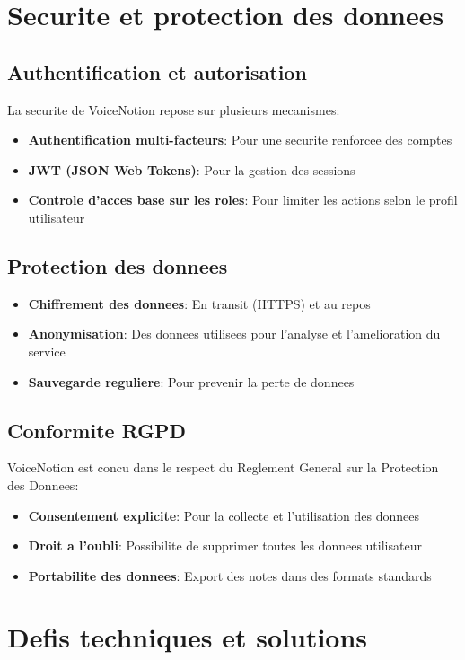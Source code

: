 \section{Securite et protection des donnees}
\subsection{Authentification et autorisation}
La securite de VoiceNotion repose sur plusieurs mecanismes:
\begin{itemize}
    \item \textbf{Authentification multi-facteurs}: Pour une securite renforcee des comptes
    \item \textbf{JWT (JSON Web Tokens)}: Pour la gestion des sessions
    \item \textbf{Controle d'acces base sur les roles}: Pour limiter les actions selon le profil utilisateur
\end{itemize}

\subsection{Protection des donnees}
\begin{itemize}
    \item \textbf{Chiffrement des donnees}: En transit (HTTPS) et au repos
    \item \textbf{Anonymisation}: Des donnees utilisees pour l'analyse et l'amelioration du service
    \item \textbf{Sauvegarde reguliere}: Pour prevenir la perte de donnees
\end{itemize}

\subsection{Conformite RGPD}
VoiceNotion est concu dans le respect du Reglement General sur la Protection des Donnees:
\begin{itemize}
    \item \textbf{Consentement explicite}: Pour la collecte et l'utilisation des donnees
    \item \textbf{Droit a l'oubli}: Possibilite de supprimer toutes les donnees utilisateur
    \item \textbf{Portabilite des donnees}: Export des notes dans des formats standards
\end{itemize}

\section{Defis techniques et solutions}
